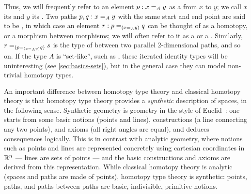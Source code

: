 Thus, we will frequently refer to an element $p : \id[A]{x}{y}$ as
a 
from $x$ to $y$; we call $x$ its 
and $y$ its .
Two paths $p,q : \id[A]{x}{y}$ with the same start and end point are said to be ,
in which case an element $r : \id[{(\id[A]{x}{y})}]{p}{q}$ can
be thought of as a homotopy, or a morphism between morphisms;
we will often refer to it as a 
%
or a .
%
%
Similarly, $\id[{(\id[{(\id[A]{x}{y})}]{p}{q})}]{r}{s}$ is the type of
%
between two parallel 2-dimensional paths, and so on.  If the
type $A$ is ``set-like'', such as \nat, these iterated identity types
will be uninteresting (see \cref{sec:basics-sets}), but in the
general case they can model non-trivial homotopy types.


An important difference between homotopy type theory and classical homotopy theory is that homotopy type theory provides a \emph{synthetic}
%
%
%
description of spaces, in the following sense. Synthetic geometry is geometry in the style of Euclid~\cite{Euclid}: one starts from some basic notions (points and lines), constructions (a line connecting any two points), and axioms
(all right angles are equal), and deduces consequences logically.  This is in contrast with analytic
%
geometry, where notions such as points and lines are represented concretely using cartesian coordinates in $\R^n$ --- lines are sets of points --- and the basic constructions and axioms are derived from this representation.  While classical homotopy theory is analytic (spaces and paths are made of points), homotopy type theory is synthetic: points, paths, and paths between paths are basic, indivisible, primitive notions.

